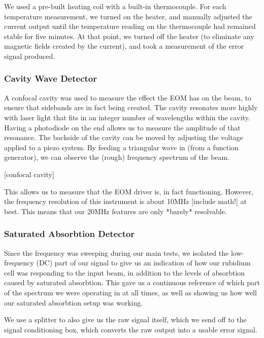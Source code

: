 We used a pre-built heating coil with a built-in thermocouple.  For each temperature measurement, we turned on the heater, and manually adjusted the current output until the temperature reading on the thermocouple had remained stable for five minutes.  At that point, we turned off the heater (to eliminate any magnetic fields created by the current), and took a measurement of the error signal produced.

    \subsubsection{Cavity Wave Detector}

A confocal cavity was used to measure the effect the EOM has on the beam, to ensure that sidebands are in fact being created.  The cavity resonates more highly with laser light that fits in an integer number of wavelengths within the cavity.  Having a photodiode on the end allows us to measure the amplitude of that resonance.  The backside of the cavity can be moved by adjusting the voltage applied to a piezo system.  By feeding a triangular wave in (from a function generator), we can observe the (rough) frequency spectrum of the beam.

[confocal cavity]

This allows us to measure that the EOM driver is, in fact functioning.  However, the frequency resolution of this instrument is about 10MHz [include math!] at best.  This means that our 20MHz features are only *barely* resolvable.

    \subsubsection{Saturated Absorbtion Detector}

Since the frequency was sweeping during our main tests, we isolated the low-frequency (DC) part of our signal to give us an indication of how our rubidium cell was responding to the input beam, in addition to the levels of absorbtion caused by saturated absorbtion.  This gave us a continuous reference of which part of the spectrum we were operating in at all times, as well as showing us how well our saturated absorbtion setup was working.

We use a splitter to also give us the raw signal itself, which we send off to the signal conditioning box, which converts the raw output into a usable error signal.

